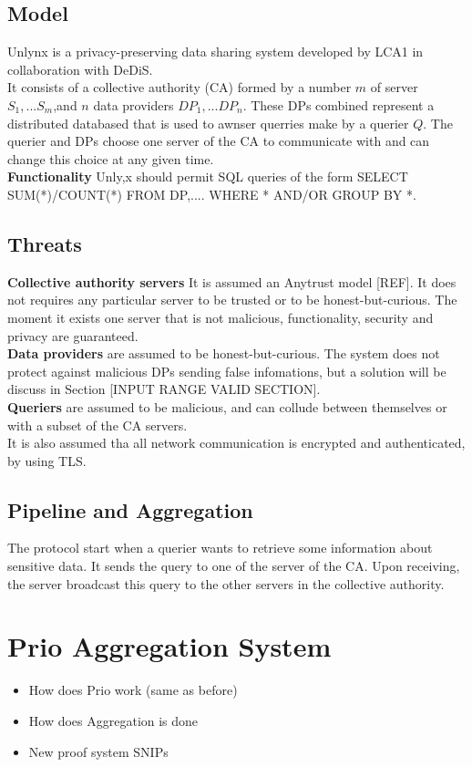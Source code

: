 \documentclass{article}
\begin{document}
\subsection{Model}
Unlynx is a privacy-preserving data sharing system developed by LCA1 in collaboration with DeDiS.\\
It consists of a collective authority (CA) formed by a number $m$ of server $S_1,...S_m$,and $n$ data providers $DP_1,...DP_n$. These DPs combined represent a distributed databased that is used to awnser querries make by a querier $Q$. The querier and DPs choose one server of the CA to communicate with and can change this choice at any given time.\\
\textbf{Functionality} Unly,x should permit SQL queries of the form SELECT SUM(*)/COUNT(*) FROM DP,.... WHERE * AND/OR GROUP BY *.\\

\subsection{Threats}
\textbf{Collective authority servers} It is assumed an Anytrust model [REF]. It does not requires any particular server to be trusted or to be honest-but-curious. The moment it exists one server that is not malicious, functionality, security and privacy are guaranteed.\\
\textbf{Data providers} are assumed to be honest-but-curious. The system does not protect against malicious DPs sending false infomations, but a solution will be discuss  in Section [INPUT RANGE VALID SECTION].\\
\textbf{Queriers} are assumed to be malicious, and can collude between themselves or with a subset of the CA servers.\\
It is also assumed tha all network communication is encrypted and authenticated, by using TLS.

\subsection{Pipeline and Aggregation}
The protocol start when a querier wants to retrieve some information about sensitive data. It sends the query to one of the server of the CA. Upon receiving, the server broadcast this query to the other servers in the collective authority.
\section*{Prio Aggregation System}
\begin{itemize}
\item How does Prio work (same as before)
\item How does Aggregation is done
\item New proof system SNIPs
\end{itemize}
\end{document}
